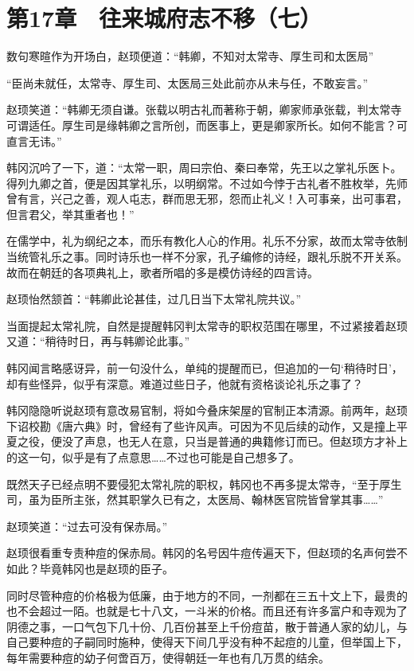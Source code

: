 \section{第17章　往来城府志不移（七）}

数句寒暄作为开场白，赵顼便道：“韩卿，不知对太常寺、厚生司和太医局”

“臣尚未就任，太常寺、厚生司、太医局三处此前亦从未与任，不敢妄言。”

赵顼笑道：“韩卿无须自谦。张载以明古礼而著称于朝，卿家师承张载，判太常寺可谓适任。厚生司是缘韩卿之言所创，而医事上，更是卿家所长。如何不能言？可直言无讳。”

韩冈沉吟了一下，道：“太常一职，周曰宗伯、秦曰奉常，先王以之掌礼乐医卜。得列九卿之首，便是因其掌礼乐，以明纲常。不过如今悖于古礼者不胜枚举，先师曾有言，兴己之善，观人屯志，群而思无邪，怨而止礼义！入可事亲，出可事君，但言君父，举其重者也！”

在儒学中，礼为纲纪之本，而乐有教化人心的作用。礼乐不分家，故而太常寺依制当统管礼乐之事。同时诗乐也一样不分家，孔子编修的诗经，跟礼乐脱不开关系。故而在朝廷的各项典礼上，歌者所唱的多是模仿诗经的四言诗。

赵顼怡然颔首：“韩卿此论甚佳，过几日当下太常礼院共议。”

当面提起太常礼院，自然是提醒韩冈判太常寺的职权范围在哪里，不过紧接着赵顼又道：“稍待时日，再与韩卿论此事。”

韩冈闻言略感讶异，前一句没什么，单纯的提醒而已，但追加的一句‘稍待时日’，却有些怪异，似乎有深意。难道过些日子，他就有资格谈论礼乐之事了？

韩冈隐隐听说赵顼有意改易官制，将如今叠床架屋的官制正本清源。前两年，赵顼下诏校勘《唐六典》时，曾经有了些许风声。可因为不见后续的动作，又是撞上平夏之役，便没了声息，也无人在意，只当是普通的典籍修订而已。但赵顼方才补上的这一句，似乎是有了点意思……不过也可能是自己想多了。

既然天子已经点明不要侵犯太常礼院的职权，韩冈也不再多提太常寺，“至于厚生司，虽为臣所主张，然其职掌久已有之，太医局、翰林医官院皆曾掌其事……”

赵顼笑道：“过去可没有保赤局。”

赵顼很看重专责种痘的保赤局。韩冈的名号因牛痘传遍天下，但赵顼的名声何尝不如此？毕竟韩冈也是赵顼的臣子。

同时尽管种痘的价格极为低廉，由于地方的不同，一剂都在三五十文上下，最贵的也不会超过一陌。也就是七十八文，一斗米的价格。而且还有许多富户和寺观为了阴德之事，一口气包下几十份、几百份甚至上千份痘苗，散于普通人家的幼儿，与自己要种痘的子嗣同时施种，使得天下间几乎没有种不起痘的儿童，但举国上下，每年需要种痘的幼子何啻百万，使得朝廷一年也有几万贯的结余。

